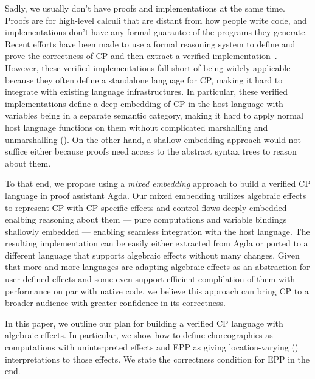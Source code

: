 Sadly, we usually don't have proofs and implementations at the same time.
%
Proofs are for high-level calculi that are distant from how people write code, and implementations don't have any formal guarantee of the programs they generate.
%
Recent efforts have been made to use a formal reasoning system to define and prove the correctness of CP and then extract a verified implementation~\citep{pohjola-2022, cruzfillipe-2023}.
%
However, these verified implementations fall short of being widely applicable because they often define a standalone language for CP, making it hard to integrate with existing language infrastructures.
%
In particular, these verified implementations define a deep embedding of CP in the host language with variables being in a separate semantic category, making it hard to apply normal host language functions on them without complicated marshalling and unmarshalling ().
%
On the other hand, a shallow embedding approach would not suffice either because proofs need access to the abstract syntax trees to reason about them.

To that end, we propose using a \emph{mixed embedding} approach to build a verified CP language in proof assistant Agda.
%
Our mixed embedding utilizes algebraic effects to represent CP with CP-specific effects and control flows deeply embedded --- enalbing reasoning about them --- pure computations and variable bindings shallowly embedded --- enabling seamless integration with the host language.
%
The resulting implementation can be easily either extracted from Agda or ported to a different language that supports algebraic effects without many changes.
%
Given that more and more languages are adapting algebraic effects as an abstraction for user-defined effects and some even support efficient complilation of them with performance on par with native code, we believe this approach can bring CP to a broader audience with greater confidence in its correctness.

In this paper, we outline our plan for building a verified CP language with algebraic effects.
%
In particular, we show how to define choreographies as computations with uninterpreted effects and EPP as giving location-varying () interpretations to those effects.
%
We state the correctness condition for EPP in the end.
